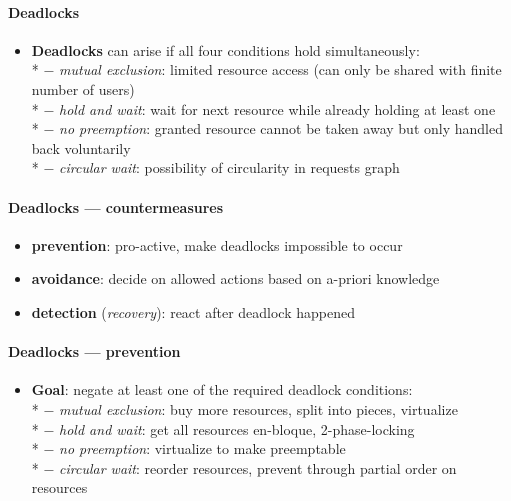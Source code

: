 \paragraph{Deadlocks}
\begin{itemize}
  \item \textbf{Deadlocks} can arise if all four conditions hold simultaneously: \\*
    $ - $ \emph{mutual exclusion}: limited resource access (can only be shared with finite number of users) \\*
    $ - $ \emph{hold and wait}: wait for next resource while already holding at least one \\*
    $ - $ \emph{no preemption}: granted resource cannot be taken away but only handled back voluntarily \\*
    $ - $ \emph{circular wait}: possibility of circularity in requests graph
\end{itemize}

\paragraph{Deadlocks --- countermeasures}
\begin{itemize}
  \item \textbf{prevention}: pro-active, make deadlocks impossible to occur
  \item \textbf{avoidance}: decide on allowed actions based on a-priori knowledge
  \item \textbf{detection} (\emph{recovery}): react after deadlock happened
\end{itemize}

\paragraph{Deadlocks --- prevention}
\begin{itemize}
  \item \textbf{Goal}: negate at least one of the required deadlock conditions: \\*
    $ - $ \emph{mutual exclusion}: buy more resources, split into pieces, virtualize \\*
    $ - $ \emph{hold and wait}: get all resources en-bloque, 2-phase-locking \\*
    $ - $ \emph{no preemption}: virtualize to make preemptable \\*
    $ - $ \emph{circular wait}: reorder resources, prevent through partial order on resources
\end{itemize}

